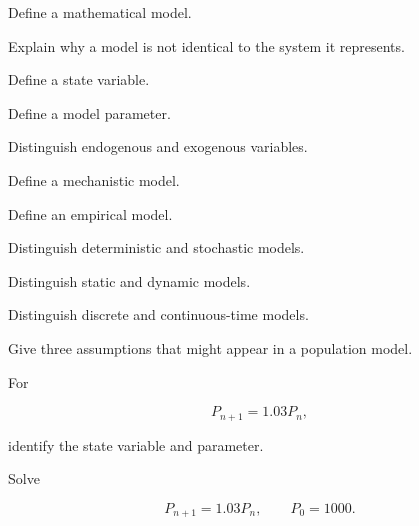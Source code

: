 \begin{exercise}[1]
Define a mathematical model.
\end{exercise}

\begin{exercise}[1]
Explain why a model is not identical to the system it represents.
\end{exercise}

\begin{exercise}[1]
Define a state variable.
\end{exercise}

\begin{exercise}[1]
Define a model parameter.
\end{exercise}

\begin{exercise}[1]
Distinguish endogenous and exogenous variables.
\end{exercise}

\begin{exercise}[1]
Define a mechanistic model.
\end{exercise}

\begin{exercise}[1]
Define an empirical model.
\end{exercise}

\begin{exercise}[1]
Distinguish deterministic and stochastic models.
\end{exercise}

\begin{exercise}[1]
Distinguish static and dynamic models.
\end{exercise}

\begin{exercise}[1]
Distinguish discrete and continuous-time models.
\end{exercise}

\begin{exercise}[2]
Give three assumptions that might appear in a population model.
\end{exercise}

\begin{exercise}[2]
For

\[
P_{n+1}=1.03P_n,
\]

identify the state variable and parameter.
\end{exercise}

\begin{exercise}[2]
Solve

\[
P_{n+1}=1.03P_n,
\qquad
P_0=1000.
\]
\end{exercise}

